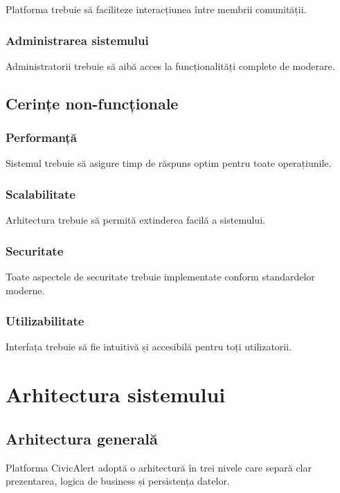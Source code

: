 \documentclass[12pt,a4paper]{report}
\begin{document}
Platforma trebuie să faciliteze interacțiunea între membrii comunității.

\subsubsection{Administrarea sistemului}

Administratorii trebuie să aibă acces la funcționalități complete de moderare.

\subsection{Cerințe non-funcționale}

\subsubsection{Performanță}

Sistemul trebuie să asigure timp de răspuns optim pentru toate operațiunile.

\subsubsection{Scalabilitate}

Arhitectura trebuie să permită extinderea facilă a sistemului.

\subsubsection{Securitate}

Toate aspectele de securitate trebuie implementate conform standardelor moderne.

\subsubsection{Utilizabilitate}

Interfața trebuie să fie intuitivă și accesibilă pentru toți utilizatorii.

\section{Arhitectura sistemului}

\subsection{Arhitectura generală}

Platforma CivicAlert adoptă o arhitectură în trei nivele care separă clar prezentarea, logica de business și persistența datelor.
\end{document}
